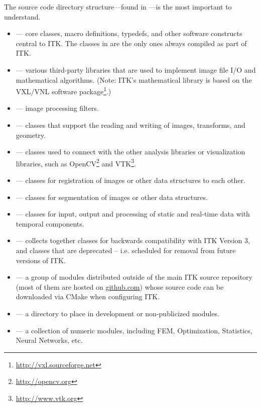 The source code directory structure---found in ---is
the most important to understand.
\begin{itemize}
        \item {} --- core classes, macro definitions,
        typedefs, and other software constructs central to ITK. The classes
        in  are the only ones always compiled as part of ITK.
        \item {} --- various third-party libraries
        that are used to implement image file I/O and mathematical algorithms.
        (Note: ITK's mathematical library is based
        on the VXL/VNL software
        package\footnote{\url{http://vxl.sourceforge.net}}.)
        \item {} --- image processing filters.
        \item {} --- classes that support the reading
        and writing of images, transforms, and geometry.
        \item {} --- classes used to connect with the
        other analysis libraries or visualization libraries, such as
        OpenCV\footnote{\url{http://opencv.org}} and
        VTK\footnote{\url{http://www.vtk.org}}.
        \item {} --- classes for registration of
        images or other data structures to each other.
        \item {} --- classes for segmentation of
        images or other data structures.
        \item {} --- classes for input, output and processing
        of static and real-time data with temporal components.
        \item {} --- collects together classes
        for backwards compatibility with ITK Version 3, and classes that are
        deprecated -- i.e. scheduled for removal from future versions of ITK.
        \item {} --- a group of modules distributed outside
        of the main ITK source repository (most of them are hosted on \url{github.com})
        whose source code can be downloaded via CMake when configuring ITK.
        \item {} --- a directory to place in development
        or non-publicized modules.
        \item {} --- a collection of numeric modules, including
        FEM, Optimization, Statistics, Neural Networks, etc.
\end{itemize}

